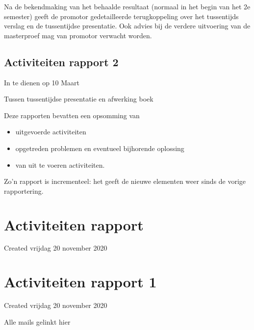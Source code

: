 \documentclass{article}
\begin{document}
Na de bekendmaking van het behaalde resultaat (normaal in het begin van het 2e semester) geeft de promotor gedetailleerde terugkoppeling over het tussentijds verslag en de tussentijdse presentatie. Ook advies bij de verdere uitvoering van de masterproef mag van promotor verwacht worden.



\subsection{Activiteiten rapport 2}

In te dienen op 10 Maart



Tussen tussentijdse presentatie  en afwerking boek

Deze rapporten bevatten een opsomming van 

\begin{itemize}
\item uitgevoerde activiteiten
\item opgetreden problemen en eventueel bijhorende oplossing
\item van uit te voeren activiteiten.
\end{itemize}
Zo’n rapport is incrementeel: het geeft de nieuwe elementen weer sinds de vorige rapportering.


























		\section{Activiteiten rapport}

Created vrijdag 20 november 2020




		\section{Activiteiten rapport 1}

Created vrijdag 20 november 2020



Alle mails gelinkt hier
\end{document}
